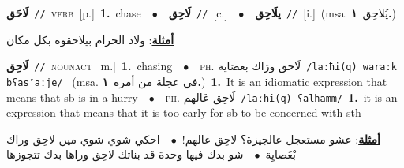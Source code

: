 \documentclass[10pt,a4paper,twoside]{article} %
\begin{document}
\begin{multicols}{2}
{\setlength\topsep{0pt}\textbf{\foreignlanguage{arabic}{لَاحَق}}\ {\color{gray}\texttt{//}\color{black}}\ \textsc{verb}\ [p.]\ \textbf{1.}~chase\ \ $\bullet$\ \ \setlength\topsep{0pt}\textbf{\foreignlanguage{arabic}{لَاحِق}}\ {\color{gray}\texttt{//}\color{black}}\ [c.]\ \ $\bullet$\ \ \setlength\topsep{0pt}\textbf{\foreignlanguage{arabic}{يلَاحِق}}\ {\color{gray}\texttt{//}\color{black}}\ [i.]\ \color{gray}(msa. \foreignlanguage{arabic}{يُلاحِق}~\foreignlanguage{arabic}{\textbf{١.}})\color{black}\  \begin{flushright}\color{gray}\foreignlanguage{arabic}{\textbf{\underline{\foreignlanguage{arabic}{أمثلة}}}: ولاد الحرام بيلاحقوه بكل مكان}\end{flushright}\color{black}} \vspace{2mm}

{\setlength\topsep{0pt}\textbf{\foreignlanguage{arabic}{لَاحِق}}\ {\color{gray}\texttt{//}\color{black}}\ \textsc{noun\textunderscore act}\ [m.]\ \textbf{1.}~chasing\ \ $\bullet$\ \ \textsc{ph.} \color{gray} \foreignlanguage{arabic}{لَاحق ورَاك بعصَاية}\color{black}\ {\color{gray}\texttt{/{\sffamily laːħi(q) waraːk bʕasˤaːje}/}\color{black}}\ \color{gray} (msa. \foreignlanguage{arabic}{في عجلة من أمره}~\foreignlanguage{arabic}{\textbf{١.}})\color{black}\ \textbf{1.}~It is an idiomatic expression that means that sb is in a hurry\ \ $\bullet$\ \ \textsc{ph.} \color{gray} \foreignlanguage{arabic}{لَاحِق عَالهم}\color{black}\ {\color{gray}\texttt{/{\sffamily laːħi(q) ʕalhamm}/}\color{black}}\ \textbf{1.}~it is an expression that means that it is too early for sb to be concerned with sth\  \begin{flushright}\color{gray}\foreignlanguage{arabic}{\textbf{\underline{\foreignlanguage{arabic}{أمثلة}}}: عشو مستعجل عالجيزة؟ لاحِق عالهم!\ $\bullet$\ \  احكي شوي شوي مين لاحِق وراك بْعَصايِة\ $\bullet$\ \  شو بدك فيها وحدة قد بناتك لاحِق وراها بدك تتجوزها}\end{flushright}\color{black}} \vspace{2mm}


\end{multicols}
\end{document}

